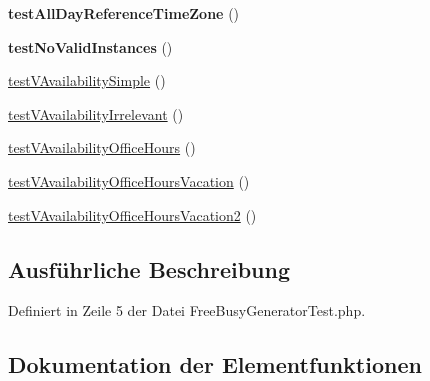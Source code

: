 \begin{DoxyCompactItemize}
{\bfseries test\+All\+Day\+Reference\+Time\+Zone} ()
\item 
\mbox{\label{class_sabre_1_1_v_object_1_1_free_busy_generator_test_ae7c3e1adc03c1fb049e9cd9655700ed3}} 
{\bfseries test\+No\+Valid\+Instances} ()
\item 
\mbox{\hyperlink{class_sabre_1_1_v_object_1_1_free_busy_generator_test_a09ebf78663f4ce7381677ee86a8d441c}{test\+V\+Availability\+Simple}} ()
\item 
\mbox{\hyperlink{class_sabre_1_1_v_object_1_1_free_busy_generator_test_a8ae72de92000b41801d1100c0e5d8605}{test\+V\+Availability\+Irrelevant}} ()
\item 
\mbox{\hyperlink{class_sabre_1_1_v_object_1_1_free_busy_generator_test_a261ade35196e18ca5481a97d67915590}{test\+V\+Availability\+Office\+Hours}} ()
\item 
\mbox{\hyperlink{class_sabre_1_1_v_object_1_1_free_busy_generator_test_aed139be6b372e69b74f7850e7400eeb9}{test\+V\+Availability\+Office\+Hours\+Vacation}} ()
\item 
\mbox{\hyperlink{class_sabre_1_1_v_object_1_1_free_busy_generator_test_a0ea2505f378168a038bb1022c131b644}{test\+V\+Availability\+Office\+Hours\+Vacation2}} ()
\end{DoxyCompactItemize}


\subsection{Ausführliche Beschreibung}


Definiert in Zeile 5 der Datei Free\+Busy\+Generator\+Test.\+php.



\subsection{Dokumentation der Elementfunktionen}
\mbox{\label{class_sabre_1_1_v_object_1_1_free_busy_generator_test_a42f5812a3fa2e68c564dea8b4667e73b}} 
